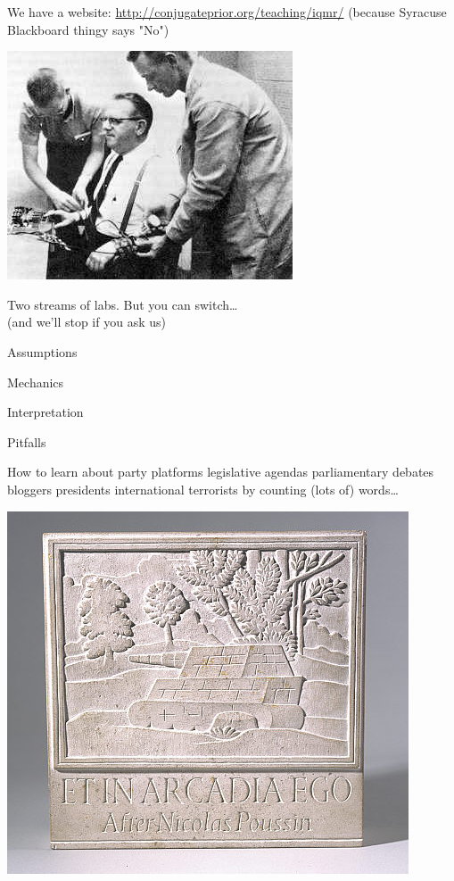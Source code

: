\documentclass{mediumfoils}
\author{\textbf{Will Lowe}\\University of Mannheim \and
 \textbf{Sven-Oliver Proksch}\\McGill University}
\date{}
\begin{document}
\maketitle


We have a website:
\ita
\itm \url{http://conjugateprior.org/teaching/iqmr/}
\itm (because Syracuse Blackboard thingy says "No")
\itz


\centerline{\includegraphics[scale=0.25]{pictures/milgram-subject}}

Two streams of labs.  But you can switch\ldots\\ (and we'll stop if you ask us)



Assumptions

Mechanics

Interpretation

Pitfalls


%

\newpage

How to learn about
\ita
\itm party platforms
\itm legislative agendas
\itm parliamentary debates
\itm bloggers
\itm presidents
\itm international terrorists
\itz
by counting (lots of) words\ldots


\centerline{\includegraphics[scale=4]{pictures/etinarcadiaego}}
\end{document}
